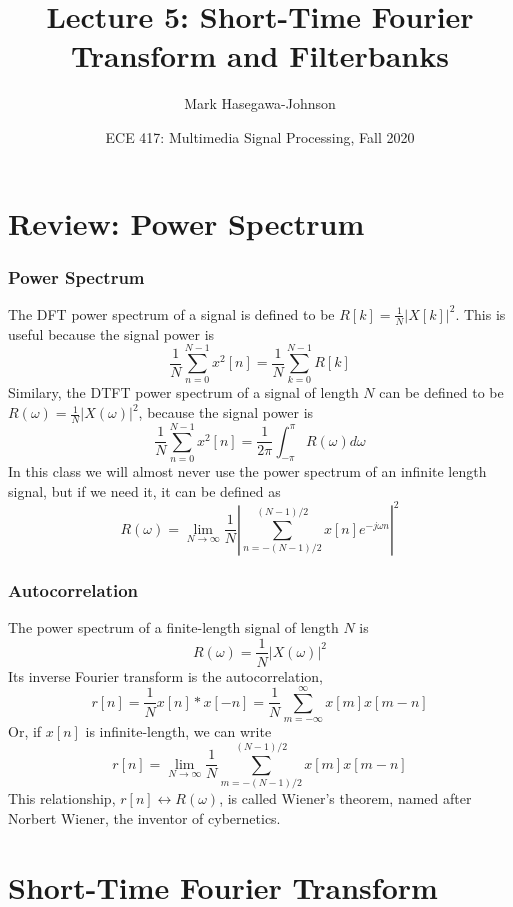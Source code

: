 \documentclass{beamer}
\title{Lecture 5: Short-Time Fourier Transform and Filterbanks}
\author{Mark Hasegawa-Johnson}
\date{ECE 417: Multimedia Signal Processing, Fall 2020}
\begin{document}
\begin{frame}
  \maketitle
\end{frame}

\begin{frame}
  \tableofcontents
\end{frame}

\section[Review]{Review: Power Spectrum}
\setcounter{subsection}{1}

\begin{frame}
  \frametitle{Power Spectrum}

  The DFT power spectrum of a signal is defined to be $R[k]=\frac{1}{N}|X[k]|^2$.  This is
  useful because the signal power is
  \[
  \frac{1}{N}\sum_{n=0}^{N-1}x^2[n] = \frac{1}{N} \sum_{k=0}^{N-1}R[k]
  \]  
  Similary, the DTFT power spectrum of a signal of length $N$ can be defined to be
  $R(\omega)=\frac{1}{N}|X(\omega)|^2$, because the signal power is
  \[
  \frac{1}{N}\sum_{n=0}^{N-1}x^2[n] = \frac{1}{2\pi}\int_{-\pi}^{\pi}R(\omega)d\omega
  \]
  In this class we will almost never use the power spectrum of an
  infinite length signal, but if we need it, it can be defined as
  \[
  R(\omega) = \lim_{N\rightarrow\infty}\frac{1}{N}\left|\sum_{n=-(N-1)/2}^{(N-1)/2} x[n]e^{-j\omega n}\right|^2
  \]
\end{frame}

\begin{frame}
  \frametitle{Autocorrelation}
  The power spectrum of a finite-length signal of length $N$ is
  \[
  R(\omega)=\frac{1}{N}|X(\omega)|^2
  \]
  Its inverse Fourier transform is the autocorrelation,
  \[
  r[n] = \frac{1}{N}x[n]\ast x[-n]  = \frac{1}{N}\sum_{m=-\infty}^\infty  x[m] x[m-n]
  \]
  Or, if $x[n]$ is infinite-length, we can write
  \[
  r[n] = \lim_{N\rightarrow\infty}\frac{1}{N}\sum_{m=-(N-1)/2}^{(N-1)/2}x[m]x[m-n]
  \]
  This relationship, $r[n]\leftrightarrow R(\omega)$, is called
  Wiener's theorem, named after Norbert Wiener, the inventor of
  cybernetics.
\end{frame}

\section[STFT]{Short-Time Fourier Transform}
\setcounter{subsection}{1}
\end{document}
